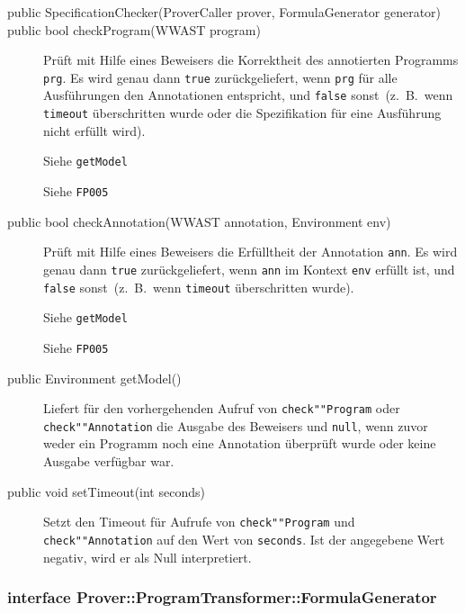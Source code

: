 
\begin{description}%
    \item[public SpecificationChecker(ProverCaller prover, FormulaGenerator generator)]%

    \item[public bool checkProgram(WWAST program)]

    Prüft mit Hilfe eines Beweisers die Korrektheit des annotierten
    Programms \texttt{prg}. Es wird genau dann \texttt{true}
    zurückgeliefert, wenn \texttt{prg} für alle Ausführungen den
    Annotationen entspricht, und \texttt{false} sonst~(z.~B.\, wenn
    \texttt{timeout} überschritten wurde oder die Spezifikation für
    eine Ausführung nicht erfüllt wird).%

    Siehe \texttt{getModel}%

    Siehe \texttt{FP005}%

    \item[public bool checkAnnotation(WWAST annotation, Environment env)]

    Prüft mit Hilfe eines Beweisers die Erfülltheit der Annotation
    \texttt{ann}. Es wird genau dann \texttt{true} zurückgeliefert,
    wenn \texttt{ann} im Kontext \texttt{env} erfüllt ist, und
    \texttt{false} sonst~(z.~B.\, wenn \texttt{timeout} überschritten
    wurde).%

    Siehe \texttt{getModel}%

    Siehe \texttt{FP005}%

    \item[public Environment getModel()]

    Liefert für den vorhergehenden Aufruf von \texttt{check""Program}
    oder \texttt{check""Annotation} die Ausgabe des Beweisers und
    \texttt{null}, wenn zuvor weder ein Programm noch eine Annotation
    überprüft wurde oder keine Ausgabe verfügbar war.%

    \item[public void setTimeout(int seconds)]

    Setzt den Timeout für Aufrufe von \texttt{check""Program} und
    \texttt{check""Annotation} auf den Wert von \texttt{seconds}. Ist
    der angegebene Wert negativ, wird er als Null interpretiert.%

\end{description}%

\subsubsection{interface Prover::ProgramTransformer::FormulaGenerator}%

